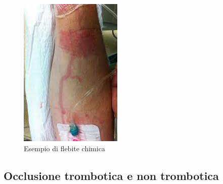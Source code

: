 \begin{figure}[H]
    \begin{center}
    \includegraphics[width=0.3\columnwidth]{img/flebite.jpeg}
    \end{center}
    \caption{Esempio di flebite chimica
    \cite{img53}}
    \label{fig:FIGURE_4.17}
\end{figure}

\subsection{Occlusione trombotica e non trombotica}

